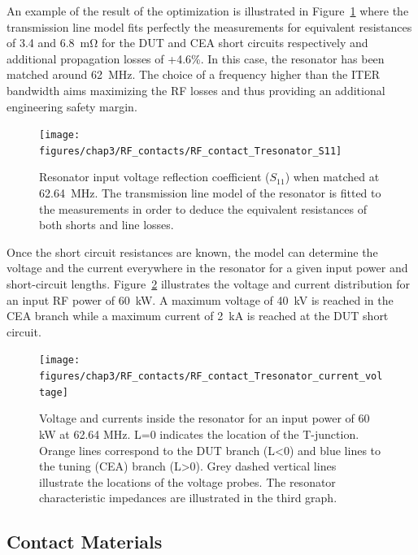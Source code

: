 {An example of the result of the optimization is illustrated in Figure~\ref{fig:rfcontacttresonators11} where the transmission line model fits perfectly the measurements for equivalent resistances of 3.4 and 6.8~mΩ for the DUT and CEA short circuits respectively and additional propagation losses of +4.6\%. In this case, the resonator has been matched around 62~MHz. The choice of a frequency higher than the ITER bandwidth aims maximizing the RF losses and thus providing an additional engineering safety margin. 

\begin{figure}[h]
	\centering
	\texttt{[image: figures/chap3/RF\_contacts/RF\_contact\_Tresonator\_S11]}
	\caption{Resonator input voltage reflection coefficient ($S_{11}$) when matched at 62.64~MHz. The transmission line model of the resonator is fitted to the measurements in order to deduce the equivalent resistances of both shorts and line losses. }
	\label{fig:rfcontacttresonators11}
\end{figure}


Once the short circuit resistances are known, the model can determine the voltage and the current everywhere in the resonator for a given input power and short-circuit lengths. Figure~\ref{fig:rfcontacttresonatorcurrentvoltage} illustrates the voltage and current distribution for an input RF power of 60~kW. A maximum voltage of 40~kV is reached in the CEA branch while a maximum current of 2~kA is reached at the DUT short circuit. 

\begin{figure}[h]
	\centering
	\texttt{[image: figures/chap3/RF\_contacts/RF\_contact\_Tresonator\_current\_voltage]}
	\caption{Voltage and currents inside the resonator for an input power of 60 kW at 62.64 MHz. L=0 indicates the location of the T-junction. Orange lines correspond to the DUT branch (L<0) and blue lines to the tuning (CEA) branch (L>0). Grey dashed vertical lines illustrate the locations of the voltage probes. The resonator characteristic impedances are illustrated in the third graph.}
	\label{fig:rfcontacttresonatorcurrentvoltage}
\end{figure}



\subsection{Contact Materials}
}
